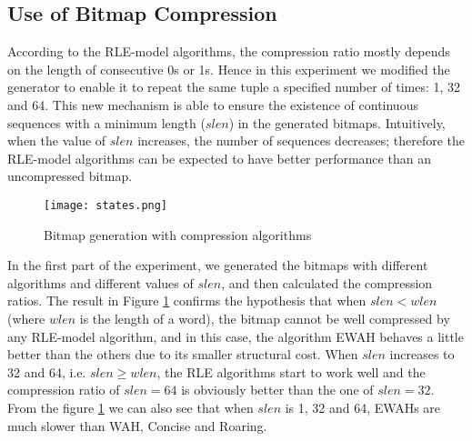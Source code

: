 
\subsection{Use of Bitmap Compression} %

According to the RLE-model algorithms, the compression ratio mostly depends on the length of consecutive 0s or 1s. Hence in this experiment we modified the generator to enable it to repeat the same tuple a specified number of times: 1, 32 and 64. This new mechanism is able to ensure the existence of continuous sequences with a minimum length ($slen$) in the generated bitmaps. Intuitively, when the value of $slen$ increases, the number of sequences decreases; therefore the RLE-model algorithms can be expected to have better performance than an uncompressed bitmap. %

\begin{figure}[h]
\begin{center}
\centering
\texttt{[image: states.png]}
\caption{Bitmap generation with compression algorithms}
\label{img:states}
\end{center}
\end{figure}

In the first part of the experiment, we generated the bitmaps with different algorithms and different values of $slen$, and then calculated the compression ratios. The result in Figure \ref{img:states} confirms the hypothesis that when $slen < wlen$ (where $wlen$ is the length of a word), the bitmap cannot be well compressed by any RLE-model algorithm, and in this case, the algorithm EWAH behaves a little better than the others due to its smaller structural cost. When $slen$ increases to 32 and 64, i.e. $slen \geq wlen$, the RLE algorithms start to work well and the compression ratio of $slen = 64$ is obviously better than the one of $slen = 32$. From the figure \ref{img:states} we can also see that when $slen$ is 1, 32 and 64, EWAHs are much slower than WAH, Concise and Roaring.

\begin{comment}
The result in Figure \ref{img:ratio} shows that when the length of consecutive bits is small ($\leq 5$), there is no great gap of the ratio among the RLE-model algorithms, Roaring bitmap and even uncompressed bitmap. The word lengths of WAH, Concise, EWAH(32bit), EWAH(64bit) are 32, 32, 32 and 64, so when the length grows beyond 50, which is over 32 and slightly less than 64, the ratios increase dramatically. The compression ratio of Roaring bitmap depends on the fraction of 1s bits in the bitmap, when the bitmap is not very sparse, the algorithm has to allocate much memory for its containers which in our opinion is the reason that its compression ratio is near 1 (uncompressed).
\end{comment}

